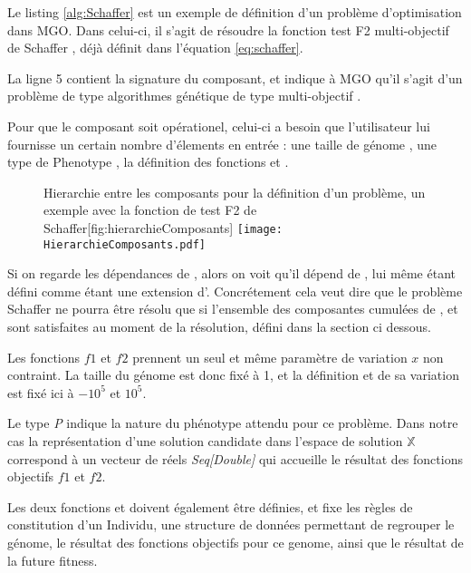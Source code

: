 Le listing \ref{alg:Schaffer} est un exemple de définition d'un problème d'optimisation dans MGO. Dans celui-ci, il s'agit de résoudre la fonction test F2 multi-objectif de Schaffer \textcite[94]{Schaffer1985}, déjà définit dans l'équation \ref{eq:schaffer}.

La ligne 5 contient la signature du composant, et indique à MGO qu'il s'agit d'un problème de type algorithmes génétique  de type multi-objectif .

Pour que le composant  soit opérationel, celui-ci a besoin que l'utilisateur lui fournisse un certain nombre d'élements en entrée : une taille de génome , une type de Phenotype , la définition des fonctions  et .

\begin{figure}[ht]
	\begin{sidecaption}[fortoc]{Hierarchie entre les composants pour la définition d'un problème, un exemple avec la fonction de test F2 de Schaffer}[fig:hierarchieComposants]
	 \centering
	 	\texttt{[image: HierarchieComposants.pdf]}
	\end{sidecaption}
\end{figure}

Si on regarde les dépendances de , alors on voit qu'il dépend de , lui même étant défini comme étant une extension d'. Concrétement cela veut dire que le problème Schaffer ne pourra être résolu que si l'ensemble des composantes cumulées de  ,  et  sont satisfaites au moment de la résolution, défini dans la section ci dessous.

Les fonctions $f1$ et $f2$ prennent un seul et même paramètre de variation $x$ non contraint. La taille  du génome est donc fixé à 1, et la définition  et  de sa variation est fixé ici à $-10^{5}$ et $10^{5}$.

Le type \emph{P} indique la nature du phénotype attendu pour ce problème. Dans notre cas la représentation d'une solution candidate dans l'espace de solution $\mathbb{X}$ correspond à un vecteur de réels \emph{Seq[Double]} qui accueille le résultat des fonctions objectifs $f1$ et $f2$.

Les deux fonctions  et  doivent également être définies, et fixe les règles de constitution d'un Individu, une structure de données permettant de regrouper le génome, le résultat des fonctions objectifs pour ce genome, ainsi que le résultat de la future fitness.

